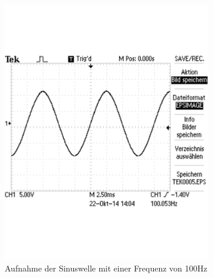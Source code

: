 \documentclass[12pt,a4paper]{article}
\begin{document}
\begin{figure}[H]
        \centering
        \begin{subfigure}[b]{0.48\textwidth}
                \includegraphics[width=\textwidth , scale = 0.4]{2_2_sin_100hz.pdf}
                \caption[Aufnahme der Sinuswelle mit einer Frequenz von 100Hz]{Aufnahme der Sinuswelle mit einer Frequenz von 100Hz}
 				 \label{fig:2_2_sin_100hz}
        \end{subfigure}%
        ~ %
        \hfill
        \begin{subfigure}[b]{0.48\textwidth}

\end{subfigure}
\end{figure}
\end{document}
